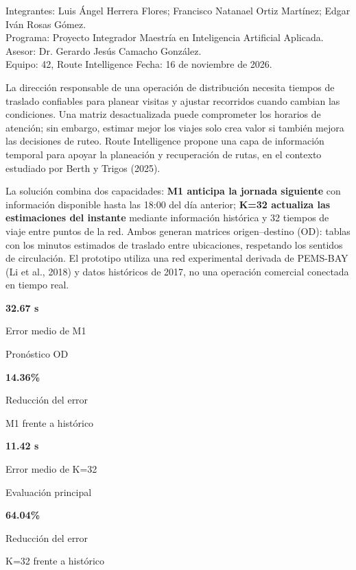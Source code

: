 \documentclass[letterpaper,11pt]{article}
\newcommand{\cifra}[3]{\begingroup\setlength{\fboxsep}{6pt}\colorbox{blue!7}{\parbox[t]{\dimexpr\linewidth-2\fboxsep\relax}{\setstretch{1}\textcolor{blue!55!black}{\Large\bfseries #1}\par\small #2\par\footnotesize #3}}\endgroup}
\begin{document}
\thispagestyle{primera}
\smallskip
\noindent{\large\textcolor{black!60}{Resumen ejecutivo | Matrices para planear y recuperar rutas}\par}
\medskip
\noindent\begingroup\setlength{\fboxsep}{7pt}\colorbox{black!7}{\parbox{\dimexpr\linewidth-2\fboxsep\relax}{\small{}
\textcolor{black!60}{Integrantes:} Luis Ángel Herrera Flores; Francisco Natanael Ortiz Martínez; Edgar Iván Rosas Gómez.\\
\textcolor{black!60}{Programa:} Proyecto Integrador \textbar{} Maestría en Inteligencia Artificial Aplicada.\\
\textcolor{black!60}{Asesor:} Dr. Gerardo Jesús Camacho González.\\
\textcolor{black!60}{Equipo:} 42, Route Intelligence \hfill \textcolor{black!60}{Fecha:} 16 de noviembre de 2026.
}}\endgroup\par\medskip

La dirección responsable de una operación de distribución necesita tiempos de traslado confiables para planear visitas y ajustar recorridos cuando cambian las condiciones. Una matriz desactualizada puede comprometer los horarios de atención; sin embargo, estimar mejor los viajes solo crea valor si también mejora las decisiones de ruteo. Route Intelligence propone una capa de información temporal para apoyar la planeación y recuperación de rutas, en el contexto estudiado por Berth y Trigos (2025).

La solución combina dos capacidades: \textbf{M1 anticipa la jornada siguiente} con información disponible hasta las 18:00 del día anterior; \textbf{K=32 actualiza las estimaciones del instante} mediante información histórica y 32 tiempos de viaje entre puntos de la red. Ambos generan matrices origen--destino (OD): tablas con los minutos estimados de traslado entre ubicaciones, respetando los sentidos de circulación. El prototipo utiliza una red experimental derivada de PEMS-BAY (Li et al., 2018) y datos históricos de 2017, no una operación comercial conectada en tiempo real.

\medskip\noindent
\begin{minipage}[t]{.235\linewidth}\cifra{32.67 s}{Error medio de M1}{Pronóstico OD}\end{minipage}\hfill
\begin{minipage}[t]{.235\linewidth}\cifra{14.36\%}{Reducción del error}{M1 frente a histórico}\end{minipage}\hfill
\begin{minipage}[t]{.235\linewidth}\cifra{11.42 s}{Error medio de K=32}{Evaluación principal}\end{minipage}\hfill
\begin{minipage}[t]{.235\linewidth}\cifra{64.04\%}{Reducción del error}{K=32 frente a histórico}\end{minipage}\par\medskip
\end{document}
